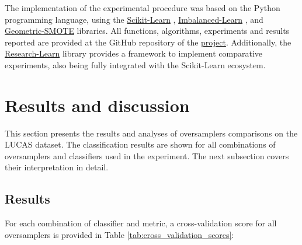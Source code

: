 \documentclass[remotesensing,article,submit,moreauthors,pdftex]{Definitions/mdpi}
\begin{document}
The implementation of the experimental procedure was based on the Python
programming language, using the
\href{https://scikit-learn.org/stable/}{Scikit-Learn} \cite{Pedregosa2011},
\href{https://imbalanced-learn.org/en/stable/}{Imbalanced-Learn} \cite{JMLR:v18:16-365},
and
\href{https://geometric-smote.readthedocs.io/en/latest/?badge=latest}{Geometric-SMOTE}
libraries. All functions, algorithms, experiments and results reported are
provided at the GitHub repository of the
\href{https://github.com/AlgoWit/publications/tree/master/remote-sensing-lucas}{project}.
Additionally, the
\href{https://research-learn.readthedocs.io/en/latest/?badge=latest}{Research-Learn}
library provides a framework to implement comparative experiments, also being
fully integrated with the Scikit-Learn ecosystem.

\section{Results and discussion}

This section presents the results and analyses of oversamplers comparisons on
the LUCAS dataset. The classification results are shown for all combinations of
oversamplers and classifiers used in the experiment. The next subsection covers
their interpretation in detail.

\subsection{Results}

For each combination of classifier and metric, a cross-validation score for all
oversamplers is provided in Table \ref{tab:cross_validation_scores}:

\end{document}
